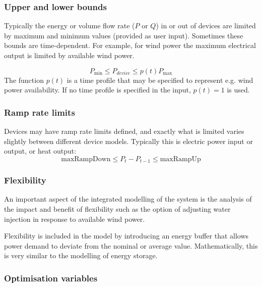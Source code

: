 \documentclass[12pt]{article}
\begin{document}
\subsubsection{Upper and lower bounds}

Typically the energy or volume flow rate ($P$ or $Q$) in or out of devices are limited by maximum and minimum values (provided as user input). Sometimes these bounds are time-dependent. For example, for wind power the maximum electrical output is limited by available wind power.

\begin{equation}
	 P_{\min } \leq P_{device} \leq p(t) P_{\max } 
\end{equation}
The function $p(t)$ is a time profile that may be specified to represent e.g. wind power availability. 
If no time profile is specified in the input,  $p(t)=1$  is used.


\subsubsection{Ramp rate limits}
Devices may have ramp rate limits defined, and exactly what is limited varies slightly between different device models.  Typically this is electric power input or output, or heat output:
\begin{equation}
	 \text{maxRampDown} \leq P_{t}-P_{t-1} \leq  \text{maxRampUp}
\end{equation}


\subsubsection{Flexibility}

An important aspect of the integrated modelling of the system is the analysis of the impact and benefit of flexibility such as the option of adjusting water injection in response to available wind power.


Flexibility is included in the model by introducing an energy buffer that allows power demand to deviate from the nominal or average value. Mathematically, this is very similar to the modelling of energy storage. 




\subsubsection{Optimisation variables}
\end{document}
